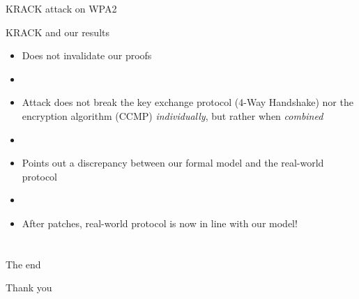 \documentclass[xcolor={dvipsnames},screen,compress]{beamer}
\makeatletter
\def\beamer@writeslidentry@miniframesoff{%
  \expandafter\beamer@ifempty\expandafter{\beamer@framestartpage}{}%
  {%
     removed \addtocontents commands
    \clearpage\beamer@notesactions%
  }
}
\newcommand*{\miniframesoff}{\let\beamer@writeslidentry=\beamer@writeslidentry@miniframesoff}
\newcommand{\backupbegin}{
   \newcounter{finalframe}
   \setcounter{finalframe}{\value{framenumber}}
}
\newcommand{\backupend}{
   \setcounter{framenumber}{\value{finalframe}}
}
\makeatother
\begin{document}
\begin{frame}{KRACK attack on WPA2}


\end{frame}

\begin{frame}{KRACK and our results}
	\begin{itemize}
	\item Does not invalidate our proofs
	
	\item[]
	
	\item Attack does not break the key exchange protocol (4-Way Handshake) nor the encryption algorithm (CCMP) \emph{individually},
	but rather when \emph{combined}
	
	\item[]
	
	\item Points out a discrepancy between our formal model and the real-world protocol
	
	\item[]
	
	\item<2> After patches, real-world protocol is now in line with our model!
	\end{itemize}
\end{frame}

\section{}


\begin{frame}{The end}
	\begin{center}
		Thank you
	\end{center}
\end{frame}

%
%
%


%
\end{document}
